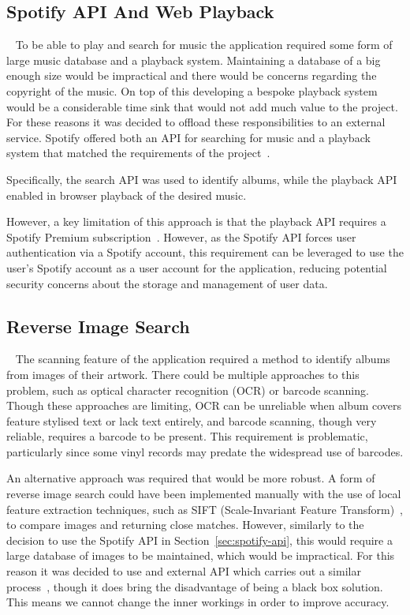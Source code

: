 \subsection{Spotify API And Web Playback}~\label{sec:spotify-api}
To be able to play and search for music the application required some form of large music database and a playback system. Maintaining a database of a big enough size would be impractical and there would be concerns regarding the copyright of the music. On top of this developing a bespoke playback system would be a considerable time sink that would not add much value to the project. For these reasons it was decided to offload these responsibilities to an external service. Spotify offered both an API for searching for music and a playback system that matched the requirements of the project~\cite{SpotifyAPI}.

Specifically, the search API was used to identify albums, while the playback API enabled in browser playback of the desired music.

However, a key limitation of this approach is that the playback API requires a Spotify Premium subscription~\cite{SpotifyPlaybackSDK}. However, as the Spotify API forces user authentication via a Spotify account, this requirement can be leveraged to use the user's Spotify account as a user account for the application, reducing potential security concerns about the storage and management of user data.

\subsection{Reverse Image Search}~\label{sec:reverse-image-search}
The scanning feature of the application required a method to identify albums from images of their artwork. There could be multiple approaches to this problem, such as optical character recognition (OCR) or barcode scanning. Though these approaches are limiting, OCR can be unreliable when album covers feature stylised text or lack text entirely, and barcode scanning, though very reliable, requires a barcode to be present. This requirement is problematic, particularly since some vinyl records may predate the widespread use of barcodes.

An alternative approach was required that would be more robust. A form of reverse image search could have been implemented manually with the use of local feature extraction techniques, such as SIFT (Scale-Invariant Feature Transform)~\cite{lowe2004distinctive}, to compare images and returning close matches. However, similarly to the decision to use the Spotify API in Section~\ref{sec:spotify-api}, this would require a large database of images to be maintained, which would be impractical. For this reason it was decided to use and external API which carries out a similar process~\cite{Gaillard2017LargeSR}, though it does bring the disadvantage of being a black box solution. This means we cannot change the inner workings in order to improve accuracy.

